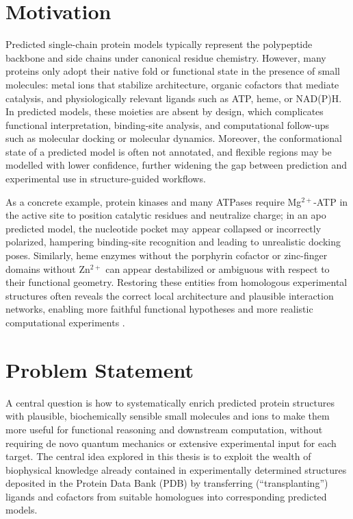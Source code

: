 \section{Motivation}
Predicted single-chain protein models typically represent the polypeptide backbone and side chains under canonical residue chemistry. However, many proteins only adopt their native fold or functional state in the presence of small molecules: metal ions that stabilize architecture, organic cofactors that mediate catalysis, and physiologically relevant ligands such as ATP, heme, or NAD(P)H. In predicted models, these moieties are absent by design, which complicates functional interpretation, binding-site analysis, and computational follow-ups such as molecular docking or molecular dynamics. Moreover, the conformational state of a predicted model is often not annotated, and flexible regions may be modelled with lower confidence, further widening the gap between prediction and experimental use in structure-guided workflows.

As a concrete example, protein kinases and many ATPases require Mg$^{2+}$-ATP in the active site to position catalytic residues and neutralize charge; in an apo predicted model, the nucleotide pocket may appear collapsed or incorrectly polarized, hampering binding-site recognition and leading to unrealistic docking poses. Similarly, heme enzymes without the porphyrin cofactor or zinc-finger domains without Zn$^{2+}$ can appear destabilized or ambiguous with respect to their functional geometry. Restoring these entities from homologous experimental structures often reveals the correct local architecture and plausible interaction networks, enabling more faithful functional hypotheses and more realistic computational experiments \cite{hekkelmanAlphaFillEnrichingAlphaFold2023}.

\section{Problem Statement}
A central question is how to systematically enrich predicted protein structures with plausible, biochemically sensible small molecules and ions to make them more useful for functional reasoning and downstream computation, without requiring de novo quantum mechanics or extensive experimental input for each target. The central idea explored in this thesis is to exploit the wealth of biophysical knowledge already contained in experimentally determined structures deposited in the Protein Data Bank (PDB) \cite{burleyRCSBProteinData2019} by transferring (``transplanting'') ligands and cofactors from suitable homologues into corresponding predicted models.


